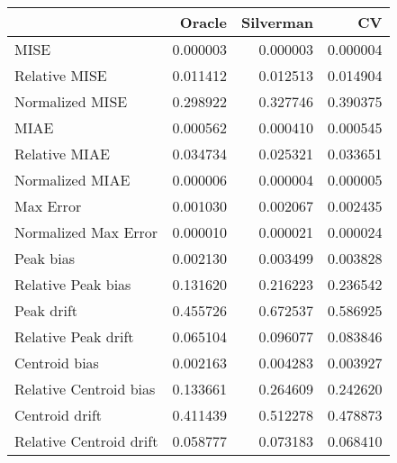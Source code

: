 \begin{tabular}{lrrr}
  \hline
 & Oracle & Silverman & CV \\ 
  \hline
MISE & 0.000003 & 0.000003 & 0.000004 \\ 
  Relative MISE & 0.011412 & 0.012513 & 0.014904 \\ 
  Normalized MISE & 0.298922 & 0.327746 & 0.390375 \\ 
  MIAE & 0.000562 & 0.000410 & 0.000545 \\ 
  Relative MIAE & 0.034734 & 0.025321 & 0.033651 \\ 
  Normalized MIAE & 0.000006 & 0.000004 & 0.000005 \\ 
  Max Error & 0.001030 & 0.002067 & 0.002435 \\ 
  Normalized Max Error & 0.000010 & 0.000021 & 0.000024 \\ 
  Peak bias & 0.002130 & 0.003499 & 0.003828 \\ 
  Relative Peak bias & 0.131620 & 0.216223 & 0.236542 \\ 
  Peak drift & 0.455726 & 0.672537 & 0.586925 \\ 
  Relative Peak drift & 0.065104 & 0.096077 & 0.083846 \\ 
  Centroid bias & 0.002163 & 0.004283 & 0.003927 \\ 
  Relative Centroid bias & 0.133661 & 0.264609 & 0.242620 \\ 
  Centroid drift & 0.411439 & 0.512278 & 0.478873 \\ 
  Relative Centroid drift & 0.058777 & 0.073183 & 0.068410 \\ 
   \hline
\end{tabular}
